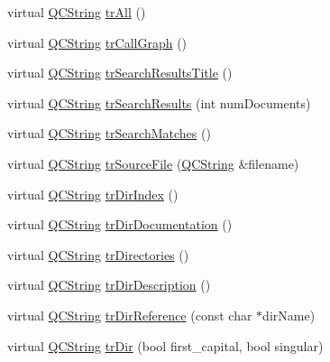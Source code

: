 \begin{DoxyCompactItemize}
virtual \mbox{\hyperlink{class_q_c_string}{Q\+C\+String}} \mbox{\hyperlink{class_translator_macedonian_a0be55ab06443dfeb9b6774ba49f7d1d0}{tr\+All}} ()
\item 
virtual \mbox{\hyperlink{class_q_c_string}{Q\+C\+String}} \mbox{\hyperlink{class_translator_macedonian_a92849623ecdc3821e8c5cdea1ecdb683}{tr\+Call\+Graph}} ()
\item 
virtual \mbox{\hyperlink{class_q_c_string}{Q\+C\+String}} \mbox{\hyperlink{class_translator_macedonian_a3aa59f4f638f5be8aa69df2b7a5d934c}{tr\+Search\+Results\+Title}} ()
\item 
virtual \mbox{\hyperlink{class_q_c_string}{Q\+C\+String}} \mbox{\hyperlink{class_translator_macedonian_a7daf5f1d4e735c35965e3b9600423532}{tr\+Search\+Results}} (int num\+Documents)
\item 
virtual \mbox{\hyperlink{class_q_c_string}{Q\+C\+String}} \mbox{\hyperlink{class_translator_macedonian_aeeaa6c6415e05d93610e34e102715977}{tr\+Search\+Matches}} ()
\item 
virtual \mbox{\hyperlink{class_q_c_string}{Q\+C\+String}} \mbox{\hyperlink{class_translator_macedonian_a8ddb69c60f68ba801c7b1846e1241e26}{tr\+Source\+File}} (\mbox{\hyperlink{class_q_c_string}{Q\+C\+String}} \&filename)
\item 
virtual \mbox{\hyperlink{class_q_c_string}{Q\+C\+String}} \mbox{\hyperlink{class_translator_macedonian_aa478e1d6f79c12010b298633241baf91}{tr\+Dir\+Index}} ()
\item 
virtual \mbox{\hyperlink{class_q_c_string}{Q\+C\+String}} \mbox{\hyperlink{class_translator_macedonian_a77e2f657f5b10b6a92984cd48976c9ed}{tr\+Dir\+Documentation}} ()
\item 
virtual \mbox{\hyperlink{class_q_c_string}{Q\+C\+String}} \mbox{\hyperlink{class_translator_macedonian_adea140dc8193a22ebb270d26d332af19}{tr\+Directories}} ()
\item 
virtual \mbox{\hyperlink{class_q_c_string}{Q\+C\+String}} \mbox{\hyperlink{class_translator_macedonian_a305dc44e06fdf716dbe46c369b5a82fc}{tr\+Dir\+Description}} ()
\item 
virtual \mbox{\hyperlink{class_q_c_string}{Q\+C\+String}} \mbox{\hyperlink{class_translator_macedonian_af49ee3467b439e5773824153d8d18c75}{tr\+Dir\+Reference}} (const char $\ast$dir\+Name)
\item 
virtual \mbox{\hyperlink{class_q_c_string}{Q\+C\+String}} \mbox{\hyperlink{class_translator_macedonian_afbffb3f70b05f35bbdf9b3095c46c4a2}{tr\+Dir}} (bool first\+\_\+capital, bool singular)
\item 

\end{DoxyCompactItemize}
